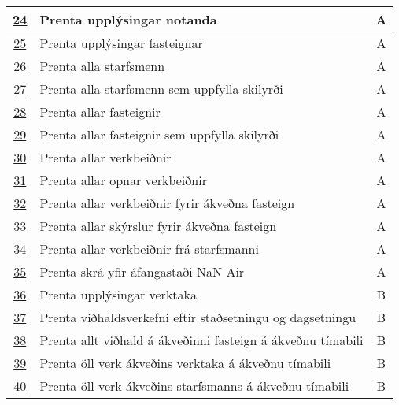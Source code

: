 \documentclass[a4paper]{article}
\begin{document}
\begin{tabular}{|c|p{10cm}|c|}
\hline
\hyperref[tab:use_case_24]{24}&Prenta upplýsingar notanda&A\\
\hline
\hyperref[tab:use_case_25]{25}&Prenta upplýsingar fasteignar&A\\
\hline
\hyperref[tab:use_case_26]{26}&Prenta alla starfsmenn&A\\
\hline
\hyperref[tab:use_case_27]{27}&Prenta alla starfsmenn sem uppfylla skilyrði&A\\
\hline
\hyperref[tab:use_case_28]{28}&Prenta allar fasteignir&A\\
\hline
\hyperref[tab:use_case_29]{29}&Prenta allar fasteignir sem uppfylla skilyrði&A\\
\hline
\hyperref[tab:use_case_30]{30}&Prenta allar verkbeiðnir&A\\
\hline
\hyperref[tab:use_case_31]{31}&Prenta allar opnar verkbeiðnir&A\\
\hline
\hyperref[tab:use_case_32]{32}&Prenta allar verkbeiðnir fyrir ákveðna fasteign&A\\
\hline
\hyperref[tab:use_case_33]{33}&Prenta allar skýrslur fyrir ákveðna fasteign&A\\
\hline
\hyperref[tab:use_case_34]{34}&Prenta allar verkbeiðnir frá starfsmanni&A\\
\hline
\hyperref[tab:use_case_35]{35}&Prenta skrá yfir áfangastaði NaN Air&A\\
\hline
\hyperref[tab:use_case_36]{36}&Prenta upplýsingar verktaka&B\\
\hline
\hyperref[tab:use_case_37]{37}&Prenta viðhaldsverkefni eftir staðsetningu og dagsetningu&B\\
\hline
\hyperref[tab:use_case_38]{38}&Prenta allt viðhald á ákveðinni fasteign á ákveðnu tímabili&B\\
\hline
\hyperref[tab:use_case_39]{39}&Prenta öll verk ákveðins verktaka á ákveðnu tímabili&B\\
\hline
\hyperref[tab:use_case_40]{40}&Prenta öll verk ákveðins starfsmanns á ákveðnu tímabili&B\\
\hline
\end{tabular}
\end{document}
